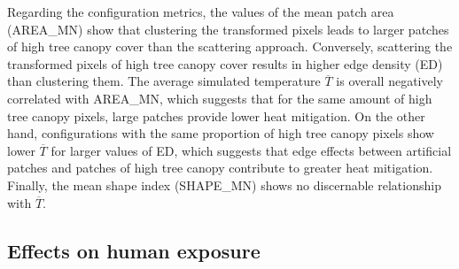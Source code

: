 \documentclass[10pt,letterpaper]{article}
\begin{document}
Regarding the configuration metrics, the values of the mean patch area (AREA\_MN) show that clustering the transformed pixels leads to larger patches of high tree canopy cover than the scattering approach. Conversely, scattering the transformed pixels of high tree canopy cover results in higher edge density (ED) than clustering them. 
The average simulated temperature $\overline{T}$ is overall negatively correlated with AREA\_MN, which suggests that for the same amount of high tree canopy pixels, large patches provide lower heat mitigation.
On the other hand, configurations with the same proportion of high tree canopy pixels show lower $\overline{T}$ for larger values of ED, which suggests that edge effects between artificial patches and patches of high tree canopy contribute to greater heat mitigation.
Finally, the mean shape index (SHAPE\_MN) shows no discernable relationship with $\overline{T}$.


\subsection*{Effects on human exposure}
\end{document}
